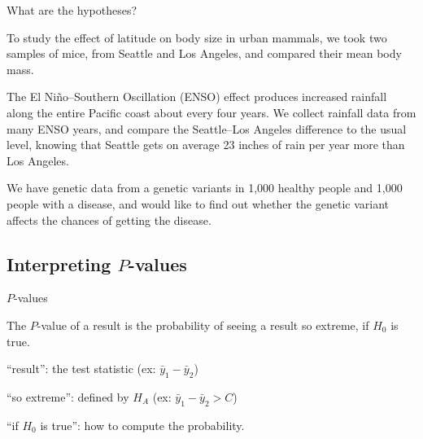 \begin{frame}{What are the hypotheses?}

  To study the effect of latitude on body size in urban mammals, 
  we took two samples of mice, from Seattle and Los Angeles,
  and compared their mean body mass.

    \vspace{2em}
    \pause

  The El Ni\~no--Southern Oscillation (ENSO) effect produces increased rainfall along the entire Pacific coast about every four years.
  We collect rainfall data from many ENSO years, and compare the Seattle--Los Angeles difference to the usual level,
  knowing that Seattle gets on average 23 inches of rain per year more than Los Angeles.


    \vspace{2em}
    \pause

  We have genetic data from a genetic variants in 1,000 healthy people and 1,000 people with a disease,
  and would like to find out whether the genetic variant affects the chances of getting the disease.

\end{frame}



\subsection{Interpreting $P$-values}


\begin{frame}{$P$-values}

    \begin{block}{}
      The \alert<1>{$P$-value} of a \alert<2>{result} is the probability of seeing a result \alert<3>{so extreme}, \alert<4>{if $H_0$ is true}.
    \end{block}

    \vspace{2em}
          \pause

    \begin{itemizew}{4em}
        \item[``result'':] the test statistic (ex: $\bar y_1 - \bar y_2$)
          \pause
        \item[``so extreme'':] defined by $H_A$ (ex: $\bar y_1 - \bar y_2 > C$)
          \pause
        \item[``if $H_0$ is true'':] how to compute the probability.
    \end{itemizew}

\end{frame}



